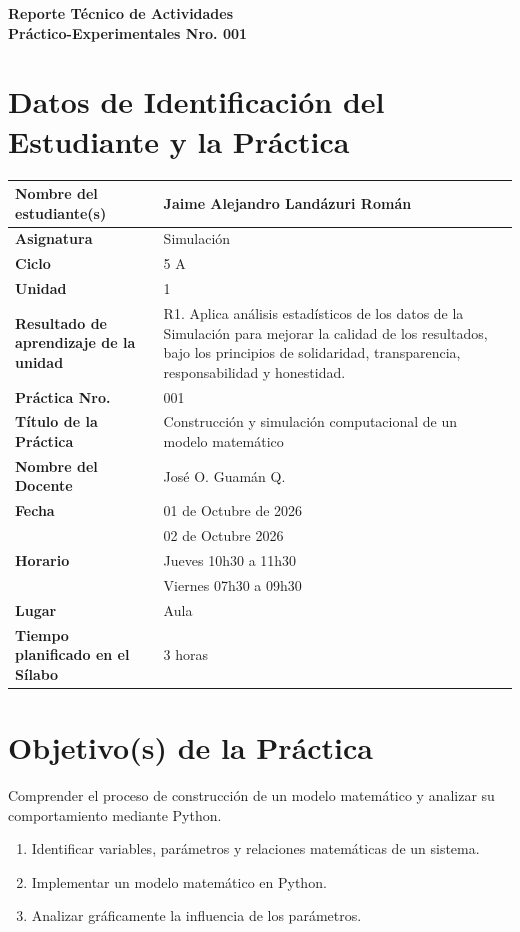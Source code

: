 \documentclass[11pt,a4paper]{article}
\begin{document}
\thispagestyle{fancy}

\vspace*{0.15cm}

\begin{center}
{\bfseries\fontsize{23}{26}\selectfont
Reporte Técnico de Actividades\\
Práctico-Experimentales Nro. 001\par}
\end{center}

\section{Datos de Identificación del Estudiante y la Práctica}

\noindent
\begin{tabularx}{\textwidth}{|L{0.43\textwidth}|Y|}
\hline
\textbf{Nombre del estudiante(s)} & Jaime Alejandro Landázuri Román \\ \hline
\textbf{Asignatura} & Simulación \\ \hline
\textbf{Ciclo} & 5 A \\ \hline
\textbf{Unidad} & 1 \\ \hline
\textbf{Resultado de aprendizaje de la unidad} & R1. Aplica análisis estadísticos de los datos
de la Simulación para mejorar la calidad de los resultados, bajo los principios de solidaridad, transparencia, responsabilidad y honestidad. \\ \hline
\textbf{Práctica Nro.} & 001 \\ \hline
\textbf{Título de la Práctica} & Construcción y simulación computacional de un modelo matemático \\ \hline
\textbf{Nombre del Docente} & José O. Guamán Q. \\ \hline
\textbf{Fecha} & 01 de Octubre de 2026 \\
 & 02 de Octubre 2026 \\ \hline
\textbf{Horario} & Jueves 10h30 a 11h30 \\
 & Viernes 07h30 a 09h30 \\ \hline
\textbf{Lugar} & Aula \\ \hline
\textbf{Tiempo planificado en el Sílabo} & 3 horas \\ \hline
\end{tabularx}

\section{Objetivo(s) de la Práctica}
Comprender el proceso de construcción de un modelo matemático y analizar su comportamiento mediante Python.
\begin{enumerate}
    \item Identificar variables, parámetros y relaciones matemáticas de un sistema.
    \item Implementar un modelo matemático en Python.
    \item Analizar gráficamente la influencia de los parámetros.
\end{enumerate}
\end{document}
